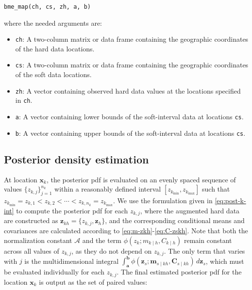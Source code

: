 \begin{verbatim}
bme_map(ch, cs, zh, a, b)
\end{verbatim}

where the needed arguments are:

\begin{itemize}
\tightlist
\item
  \texttt{ch}: A two-column matrix or data frame containing the geographic coordinates of the hard data locations.
\item
  \texttt{cs}: A two-column matrix or data frame containing the geographic coordinates of the soft data locations.
\item
  \texttt{zh}: A vector containing observed hard data values at the locations specified in \texttt{ch}.
\item
  \texttt{a}: A vector containing lower bounds of the soft-interval data at locations \texttt{cs}.
\item
  \texttt{b}: A vector containing upper bounds of the soft-interval data at locations \texttt{cs}.
\end{itemize}

\subsection{Posterior density estimation}\label{posterior-density-estimation}

At location \(\boldsymbol{x}_k\), the posterior pdf is evaluated on an evenly spaced sequence of values \(\{ z_{k,j} \}_{j=1}^{n_k}\) within a reasonably defined interval \([z_{k_{\min}}, z_{k_{\max}}]\) such that \(z_{k_{\min}}= z_{k,1} < z_{k,2} < \cdots < z_{k,n_k}=z_{k_{\max}}\). We use the formulation given in \eqref{eq:post-k-int} to compute the posterior pdf for each \(z_{k,j}\), where the augmented hard data are constructed as \(\boldsymbol{z}_{kh} = \{z_{k,j}, \boldsymbol{z}_h \}\), and the corresponding conditional means and covariances are calculated according to \eqref{eq:m-zkh}-\eqref{eq:C-zskh}. Note that both the normalization constant \(\mathcal{A}\) and the term \(\phi(z_k; m_{k \mid h}, C_{k \mid h})\) remain constant across all values of \(z_{k,j}\), as they do not depend on \(z_{k,j}\). The only term that varies with \(j\) is the multidimensional integral \(\int_{\boldsymbol{a}}^{\boldsymbol{b}} \phi(\boldsymbol{z}_s; \boldsymbol{m}_{s \mid kh}, \boldsymbol{C}_{s \mid kh}) \, d\boldsymbol{z}_s\), which must be evaluated individually for each \(z_{k,j}\). The final estimated posterior pdf for the location \(\boldsymbol{x}_k\) is output as the set of paired values:

